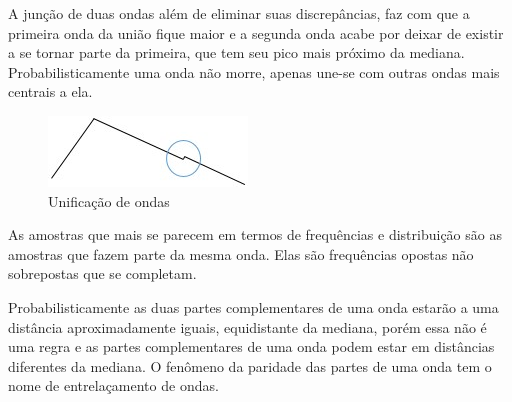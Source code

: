 A junção de duas ondas além de eliminar suas discrepâncias, faz com que a primeira onda da união fique maior e a segunda onda acabe por deixar de existir a se tornar parte da primeira, que tem seu pico mais próximo da mediana. Probabilisticamente uma onda não morre, apenas une-se com outras ondas mais centrais a ela.
	\begin{figure}[H]
	\caption{Unificação de ondas}
	\label{fig:consciousness_uniform_wave}
	\centering
	\includegraphics[scale=1]{sections/images/consciousness_uniform_wave.jpg}
	\end{figure}

As amostras que mais se parecem em termos de frequências e distribuição são as amostras que fazem parte da mesma onda. Elas são frequências opostas não sobrepostas que se completam.

Probabilisticamente as duas partes complementares de uma onda estarão a uma distância aproximadamente iguais, equidistante da mediana, porém essa não é uma regra e as partes complementares de uma onda podem estar em distâncias diferentes da mediana. O fenômeno da paridade das partes de uma onda tem o nome de entrelaçamento de ondas.

